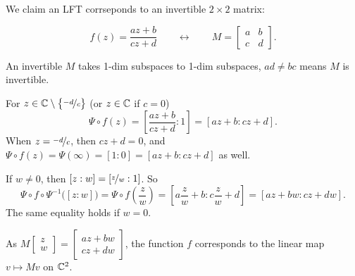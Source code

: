 \documentclass[10pt,aspectratio=169]{beamer}
\begin{document}
\begin{frame}
We claim an LFT corrseponds to an invertible $2 \times 2$ matrix:

\[
f(z) = \frac{a z + b}{c z + d}
\qquad
\leftrightarrow
\qquad
M =
\begin{bmatrix}
a & b \\
c & d
\end{bmatrix} .
\]

\pause

An invertible $M$ takes 1-dim subspaces to 1-dim subspaces,
$ad\not=bc$ means $M$ is invertible.

\medskip
\pause

For $z \in {\mathbb{C}} \setminus \bigl\{ \nicefrac{-d}{c} \bigr\}$ (or $z \in {\mathbb{C}}$ if $c=0$)
\[
\Psi \circ f(z) =
\left[\frac{a z + b}{c z + d}: 1 \right]
=
\left[a z + b: c z + d \right] .
\]
When $z = \nicefrac{-d}{c}$, then $cz+d = 0$, and
$\Psi\circ f(z) = \Psi(\infty) = [1:0] = [az+b : cz+d]$ as well.

\medskip
\pause

If $w \not= 0$, then $[z:w] = [ \nicefrac{z}{w}:1 ]$.  So
\[
\Psi \circ f \circ \Psi^{-1} \bigl([z:w]\bigr) =
\Psi \circ f \left(\frac{z}{w}\right) =
\left[a \frac{z}{w} + b : c \frac{z}{w} + d \right] =
\left[a z + b w: c z + d w \right] .
\]
The same equality holds if $w=0$.

\medskip
\pause

As
$M \left[ \begin{smallmatrix} z \\ w \end{smallmatrix} \right]
= \left[ \begin{smallmatrix} 
a z + b w \\ c z + d w
\end{smallmatrix} \right]$,
the function $f$ corresponds to the linear map $v \mapsto Mv$ on ${\mathbb{C}}^2$.

\end{frame}
\end{document}
